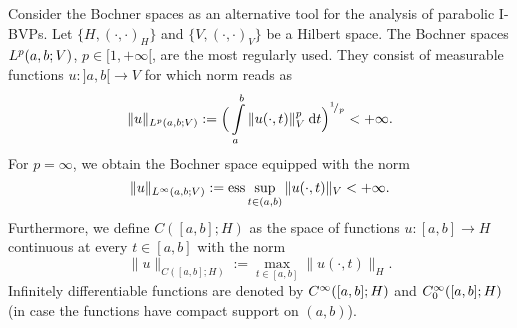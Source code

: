 Consider the Bochner spaces as an alternative tool for the analysis of parabolic 
\linebreak I-BVPs. 
Let $\{H, (\cdot, \cdot)_H\}$ and $\{V, (\cdot, \cdot)_V\}$ be a Hilbert space. 
%
The Bochner spaces $L^{p}(a, b; V)$, 
$p \in [1, +\infty[$, are the most regularly used. They consist of 
measurable functions $u: ]a, b[ \rightarrow V$ for which norm reads as   
%
\begin{equation*}
\|u\|_{\L{p} (a, b; V)} := \Big( \Int_a^b \| u(\cdot, t)\|^p_{V} \dt \Big)^{\rfrac{1}{p}} < +\infty.
\end{equation*}
%
For $p = \infty$, we obtain the Bochner space equipped with the norm
%
\begin{equation*}
\|u\|_{\L{\infty} (a, b; V)} 
:= {\rm ess} \Sup_{t \in (a, b)} \| u(\cdot, t)\|_{V} < + \infty.
\end{equation*}
%
Furthermore, we define $C([a, b]; H)$ as the space of functions 
$u: [a, b] \rightarrow H$ continuous at every $t \in [a, b]$ with the norm 
%
\begin{equation*}
\|u\|_{C ([a, b]; H)} 
:= \max\limits_{t \in [a, b]} \| u(\cdot, t)\|_{H}.
\end{equation*}
%
Infinitely differentiable functions are denoted by $C^{\infty}([a, b]; H)$ and 
$C_0^{\infty} ([a, b]; H)$ (in case the functions have compact support on $(a, b)$).

